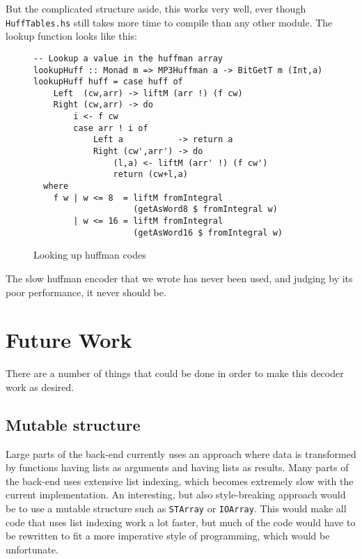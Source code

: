 \documentclass[a4paper,12pt]{article}
\begin{document}
        But the complicated structure aside, this works very well, ever though
        \texttt{HuffTables.hs} still takes more time to compile than any other
        module.  The lookup function looks like this:
\begin{figure}[H]
  \begin{center}
        \begin{lstlisting}
-- Lookup a value in the huffman array
lookupHuff :: Monad m => MP3Huffman a -> BitGetT m (Int,a)
lookupHuff huff = case huff of
    Left  (cw,arr) -> liftM (arr !) (f cw)
    Right (cw,arr) -> do
        i <- f cw
        case arr ! i of
            Left a           -> return a
            Right (cw',arr') -> do
                (l,a) <- liftM (arr' !) (f cw')
                return (cw+l,a)
  where
    f w | w <= 8  = liftM fromIntegral
                    (getAsWord8 $ fromIntegral w)
        | w <= 16 = liftM fromIntegral
                    (getAsWord16 $ fromIntegral w)
        \end{lstlisting}
    \caption{Looking up huffman codes}\label{fig:lookuphuff}
  \end{center}
\end{figure}

        The slow huffman encoder that we wrote has never been used, and judging
        by its poor performance, it never should be.

\section{Future Work}
    There are a number of things that could be done in order to make this
    decoder work as desired.

    \subsection{Mutable structure}
        Large parts of the back-end currently uses an approach where data is
        transformed by functions having lists as arguments and having lists as
        results. Many parts of the back-end uses extensive list indexing, which
        becomes extremely slow with the current implementation. An interesting,
        but also style-breaking approach would be to use a mutable structure
        such as \texttt{STArray} or \texttt{IOArray}. This would make all code
        that uses list indexing work a lot faster, but much of the code would
        have to be rewritten to fit a more imperative style of programming,
        which would be unfortunate.
\end{document}

